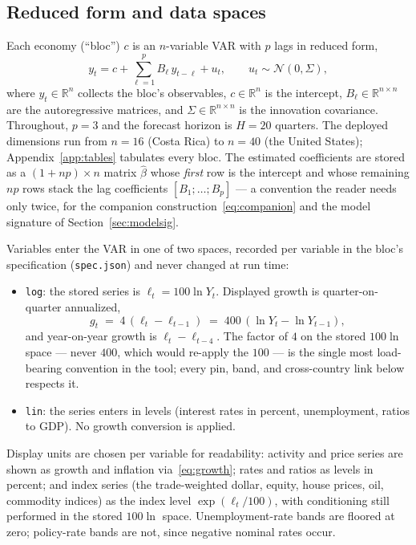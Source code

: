 \documentclass[11pt]{article}
\newcommand{\R}{\mathbb{R}}
\theoremstyle{plain}
\theoremstyle{remark}
\begin{document}
\subsection{Reduced form and data spaces}\label{sec:spaces}

Each economy (``bloc'') $c$ is an $n$-variable VAR with $p$ lags in
reduced form,
\begin{equation}\label{eq:var}
  y_t = c + \sum_{\ell=1}^{p} B_\ell\, y_{t-\ell} + u_t,
  \qquad u_t \sim \mathcal{N}(0, \Sigma),
\end{equation}
where $y_t \in \R^n$ collects the bloc's observables, $c \in \R^n$ is
the intercept, $B_\ell \in \R^{n\times n}$ are the autoregressive
matrices, and $\Sigma \in \R^{n\times n}$ is the innovation covariance.
Throughout, $p=3$ and the forecast horizon is $H=20$ quarters. The
deployed dimensions run from $n=16$ (Costa Rica) to $n=40$ (the United
States); Appendix~\ref{app:tables} tabulates every bloc. The estimated
coefficients are stored as a $(1+np)\times n$ matrix $\hat\beta$ whose
\emph{first} row is the intercept and whose remaining $np$ rows stack
the lag coefficients $[B_1;\dots;B_p]$ --- a convention the reader needs
only twice, for the companion construction~\eqref{eq:companion} and the
model signature of Section~\ref{sec:modelsig}.

Variables enter the VAR in one of two spaces, recorded per variable in
the bloc's specification (\texttt{spec.json}) and never changed at run
time:
\begin{itemize}
  \item \texttt{log}: the stored series is $\ell_t = 100\ln Y_t$.
    Displayed growth is quarter-on-quarter annualized,
    \begin{equation}\label{eq:growth}
      g_t \;=\; 4\,(\ell_t - \ell_{t-1}) \;=\; 400\,(\ln Y_t - \ln Y_{t-1}),
    \end{equation}
    and year-on-year growth is $\ell_t - \ell_{t-4}$. The factor of
    $4$ on the stored $100\ln$ space --- never $400$, which would
    re-apply the $100$ --- is the single most load-bearing convention in
    the tool; every pin, band, and cross-country link below respects it.
  \item \texttt{lin}: the series enters in levels (interest rates in
    percent, unemployment, ratios to GDP). No growth conversion is
    applied.
\end{itemize}
Display units are chosen per variable for readability: activity and
price series are shown as growth and inflation via~\eqref{eq:growth};
rates and ratios as levels in percent; and index series (the
trade-weighted dollar, equity, house prices, oil, commodity indices) as
the index level $\exp(\ell_t/100)$, with conditioning still performed in
the stored $100\ln$ space. Unemployment-rate bands are floored at zero;
policy-rate bands are not, since negative nominal rates occur.
\end{document}

